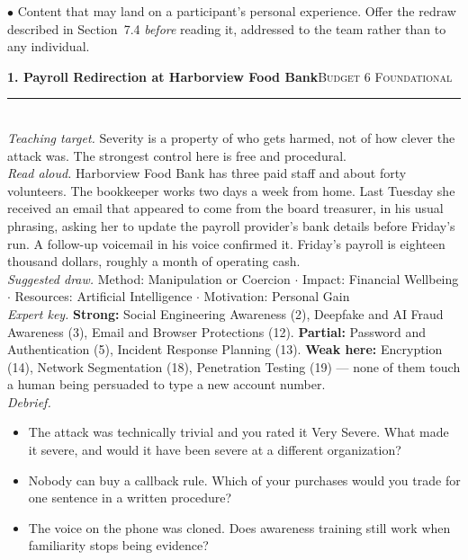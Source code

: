 \vspace{0.4em}
{\small $\bullet$ Content that may land on a participant's personal experience.
Offer the redraw described in Section~7.4 \emph{before} reading it, addressed to
the team rather than to any individual.}

\newcommand{\scen}[3]{%
  \vspace{1.0em}\noindent
  \textbf{#1. #2}\hfill{\small\textsc{#3}}\\[0.15em]
  \rule{\linewidth}{0.4pt}\\[0.25em]}
\newcommand{\sfld}[1]{\textit{#1}\hspace{0.4em}}

\scen{1}{Payroll Redirection at Harborview Food Bank}{Budget 6 \quad Foundational}
\sfld{Teaching target.} Severity is a property of who gets harmed, not of how
clever the attack was. The strongest control here is free and procedural.\\
\sfld{Read aloud.} Harborview Food Bank has three paid staff and about forty
volunteers. The bookkeeper works two days a week from home. Last Tuesday she
received an email that appeared to come from the board treasurer, in his usual
phrasing, asking her to update the payroll provider's bank details before
Friday's run. A follow-up voicemail in his voice confirmed it. Friday's payroll
is eighteen thousand dollars, roughly a month of operating cash.\\
\sfld{Suggested draw.} Method: Manipulation or Coercion $\cdot$ Impact: Financial
Wellbeing $\cdot$ Resources: Artificial Intelligence $\cdot$ Motivation:
Personal Gain\\
\sfld{Expert key.} \textbf{Strong:} Social Engineering Awareness (2), Deepfake
and AI Fraud Awareness (3), Email and Browser Protections (12). \textbf{Partial:}
Password and Authentication (5), Incident Response Planning (13).
\textbf{Weak here:} Encryption (14), Network Segmentation (18), Penetration
Testing (19) --- none of them touch a human being persuaded to type a new account
number.\\
\sfld{Debrief.}
\begin{itemize}
\item The attack was technically trivial and you rated it Very Severe. What made
it severe, and would it have been severe at a different organization?
\item Nobody can buy a callback rule. Which of your purchases would you trade
for one sentence in a written procedure?
\item The voice on the phone was cloned. Does awareness training still work when
familiarity stops being evidence?
\end{itemize}

